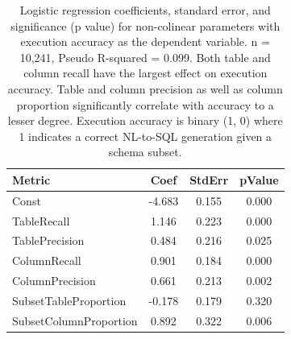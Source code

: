 \begin{table}
\caption{Logistic regression coefficients, standard error, and significance (p value) for non-colinear parameters with execution accuracy as the dependent variable. n = 10,241, Pseudo R-squared = 0.099. Both table and column recall have the largest effect on execution accuracy. Table and column precision as well as column proportion significantly correlate with accuracy to a lesser degree. Execution accuracy is binary (1, 0) where 1 indicates a correct NL-to-SQL generation given a schema subset.}
\label{tab:executionaccuracycorrelations}
\begin{tabular}{lccc}
\toprule
Metric & Coef & StdErr & pValue \\
\midrule
Const & -4.683 & 0.155 & 0.000 \\
TableRecall & 1.146 & 0.223 & 0.000 \\
TablePrecision & 0.484 & 0.216 & 0.025 \\
ColumnRecall & 0.901 & 0.184 & 0.000 \\
ColumnPrecision & 0.661 & 0.213 & 0.002 \\
SubsetTableProportion & -0.178 & 0.179 & 0.320 \\
SubsetColumnProportion & 0.892 & 0.322 & 0.006 \\
\bottomrule
\end{tabular}
\end{table}
